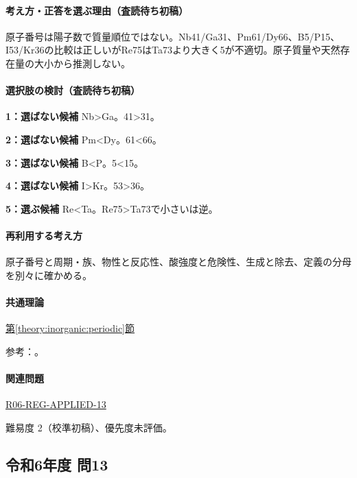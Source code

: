 \paragraph{考え方・正答を選ぶ理由（査読待ち初稿）} 原子番号は陽子数で質量順位ではない。Nb41/Ga31、Pm61/Dy66、B5/P15、I53/Kr36の比較は正しいがRe75はTa73より大きく5が不適切。原子質量や天然存在量の大小から推測しない。

\paragraph{選択肢の検討（査読待ち初稿）}\mbox{}\par

\noindent\textbf{1：選ばない候補} Nb>Ga。41>31。\par

\noindent\textbf{2：選ばない候補} Pm<Dy。61<66。\par

\noindent\textbf{3：選ばない候補} B<P。5<15。\par

\noindent\textbf{4：選ばない候補} I>Kr。53>36。\par

\noindent\textbf{5：選ぶ候補} Re<Ta。Re75>Ta73で小さいは逆。\par

\paragraph{再利用する考え方} 原子番号と周期・族、物性と反応性、酸強度と危険性、生成と除去、定義の分母を別々に確かめる。

\paragraph{共通理論} \hyperref[theory:inorganic:periodic]{第\ref*{theory:inorganic:periodic}節}

\par 参考：\cite{atomic_nist2019}。

\paragraph{関連問題} \hyperref[q:r06-reg-applied-13]{R06-REG-APPLIED-13}

\par 難易度 2（校準初稿）、優先度未評価。

\subsection{令和6年度 問13}
\label{q:r06-reg-applied-13}


